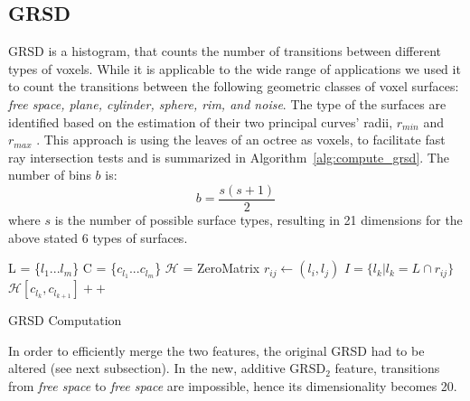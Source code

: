 \documentclass[a4paper, 10 pt, conference]{sty/ieeeconf}
\def\cH{\mathcal{H}}
\begin{document}
\subsection{GRSD}
\label{sec:grsd}
GRSD is a histogram, that counts the number of transitions between different types of voxels.
While it is applicable to the wide range of applications we used it to count the transitions between 
the following geometric classes of voxel surfaces: \emph{free space, plane, cylinder, sphere, rim, and noise}.
The type of the surfaces are identified based on the estimation of their
two principal curves' radii, $r_{min}$ and $r_{max}$ \cite{Marton10IROS}. 
This approach is using the leaves of an octree as voxels, to facilitate fast ray intersection
tests and is summarized in Algorithm~\ref{alg:compute_grsd}.
The number of bins $b$ is:
\begin{equation}
b=\frac{s(s+1)}{2}
\end{equation}
where $s$ is the number of possible surface types,
resulting in 21 dimensions for the above stated 6 types of surfaces.

\begin{algorithm}[htb!]
L = \{$l_{1}...l_{m}$\} 
C = \{$c_{l_1}...c_{l_m}$\} 
$\cH$ = ZeroMatrix 
  {
    {
      $r_{ij} \leftarrow (l_{i},l_{j})$ 
      $I = \{l_{k}|l_{k} = L \cap r_{ij}\}$ 
      {
        $\cH[c_{l_k},c_{l_{k+1}}]++$ 
      }
    }
  }
  \caption{GRSD Computation}
  \label{alg:compute_grsd}
\end{algorithm}

In order to efficiently merge the two features, the original GRSD had to be altered (see next subsection). 
In the new, additive GRSD$_2$ feature, transitions from \emph{free space} to \emph{free space} are impossible,
hence its dimensionality becomes 20.
\end{document}

